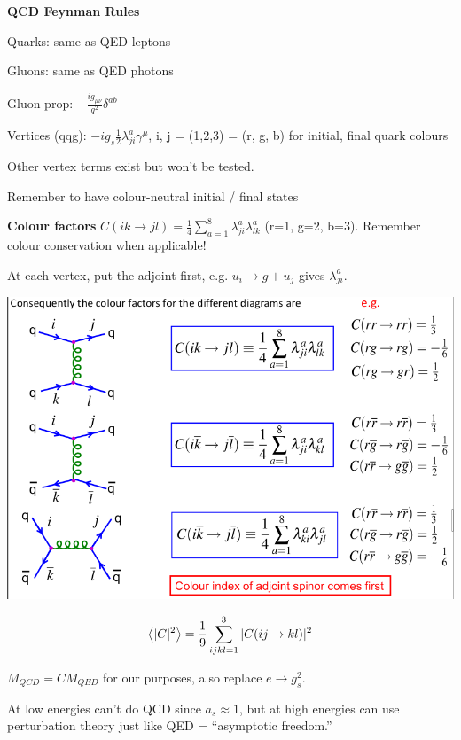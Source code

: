 \textbf{QCD Feynman Rules}

Quarks: same as QED leptons

Gluons: same as QED photons

Gluon prop: $-\frac{ig_{\mu\nu}}{q^2}\delta^{ab}$

Vertices (qqg): $-ig_s\frac{1}{2}\lambda^a_{ji}\gamma^\mu$, i, j = (1,2,3) = (r, g, b) for initial, final quark colours

Other vertex terms exist but won't be tested.

Remember to have colour-neutral initial / final states

\textbf{Colour factors} $C(ik \to jl) = \frac{1}{4}\sum_{a=1}^8 \lambda^{a}_{ji}\lambda^a_{lk}$ (r=1, g=2, b=3). Remember colour conservation when applicable!

At each vertex, put the adjoint first, e.g. $u_i \to g+u_j$ gives $\lambda^a_{ji}$.

\begin{center}
    \includegraphics[width=\linewidth]{images/colour_factors.png}
\end{center}

\begin{align*}
    \expval{|C|^2} &= \frac{1}{9}\sum_{ijkl=1}^3 |C(ij\to kl)|^2 \\
\end{align*}

$M_{QCD} = C M_{QED}$ for our purposes, also replace $e \to g_s^2$.

At low energies can't do QCD since $a_s \approx 1$, but at high energies can use perturbation theory just like QED = ``asymptotic freedom.''
